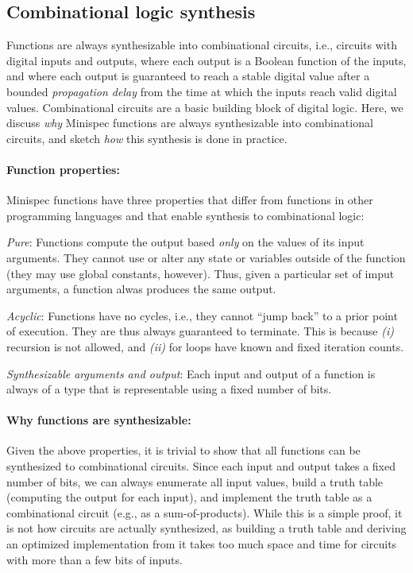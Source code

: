\subsection{Combinational logic synthesis}
\label{sec:combinational}

Functions are always synthesizable into combinational circuits, i.e.,
circuits with digital inputs and outputs, where each output is a Boolean function of the inputs,
and where each output is guaranteed to reach a stable digital value after
a bounded \emph{propagation delay} from the time at which the inputs reach valid digital values.
Combinational circuits are a basic building block of digital logic.
Here, we discuss \emph{why} Minispec functions are always synthesizable into combinational circuits, and
sketch \emph{how} this synthesis is done in practice.

\paragraph{Function properties:}
Minispec functions have three properties that differ from
functions in other programming languages and that enable synthesis to combinational logic:
\begin{compactenum}
\item \emph{Pure}: Functions compute the output based \emph{only} on the values of its input arguments.
  They cannot use or alter any state or variables outside of the function
  (they may use global constants, however).
  Thus, given a particular set of imput arguments, a function alwas produces the same output.
\item \emph{Acyclic}: Functions have no cycles, i.e., they cannot ``jump back'' to a prior point of execution. 
  They are thus always guaranteed to terminate.
  This is because \emph{(i)} recursion is not allowed, and \emph{(ii)} for loops have known and fixed iteration counts.
\item \emph{Synthesizable arguments and output}: Each input and output of a function is always
  of a type that is representable using a fixed number of bits.
\end{compactenum}

\paragraph{Why functions are synthesizable:}
Given the above properties, it is trivial to show that all functions can be synthesized to combinational circuits.
Since each input and output takes a fixed number of bits, we can always
enumerate all input values, build a truth table (computing the output for each input),
and implement the truth table as a combinational circuit (e.g., as a sum-of-products).
While this is a simple proof, it is not how circuits are actually synthesized,
as building a truth table and deriving an optimized implementation from it
takes too much space and time for circuits with more than a few bits of inputs.

